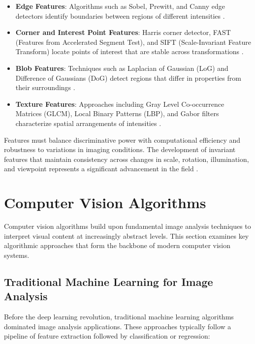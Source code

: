\begin{itemize}
    \item \textbf{Edge Features}: Algorithms such as Sobel, Prewitt, and Canny edge detectors identify boundaries between regions of different intensities \cite{canny1986computational}.
    
    \item \textbf{Corner and Interest Point Features}: Harris corner detector, FAST (Features from Accelerated Segment Test), and SIFT (Scale-Invariant Feature Transform) locate points of interest that are stable across transformations \cite{lowe2004distinctive}.
    
    \item \textbf{Blob Features}: Techniques such as Laplacian of Gaussian (LoG) and Difference of Gaussians (DoG) detect regions that differ in properties from their surroundings \cite{lindeberg1998feature}.
    
    \item \textbf{Texture Features}: Approaches including Gray Level Co-occurrence Matrices (GLCM), Local Binary Patterns (LBP), and Gabor filters characterize spatial arrangements of intensities \cite{haralick1973textural}.
\end{itemize}

Features must balance discriminative power with computational efficiency and robustness to variations in imaging conditions. The development of invariant features that maintain consistency across changes in scale, rotation, illumination, and viewpoint represents a significant advancement in the field \cite{mikolajczyk2005performance}.

\section{Computer Vision Algorithms}
Computer vision algorithms build upon fundamental image analysis techniques to interpret visual content at increasingly abstract levels. This section examines key algorithmic approaches that form the backbone of modern computer vision systems.

\subsection{Traditional Machine Learning for Image Analysis}
Before the deep learning revolution, traditional machine learning algorithms dominated image analysis applications. These approaches typically follow a pipeline of feature extraction followed by classification or regression:


